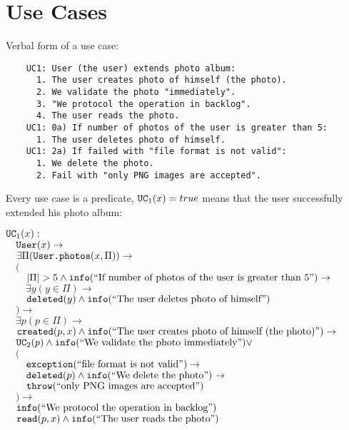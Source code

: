 \documentclass{article}
\begin{document}
\newpage
\section{Use Cases}

    Verbal form of a use case:
    
    \begin{verbatim}
    UC1: User (the user) extends photo album:
      1. The user creates photo of himself (the photo).
      2. We validate the photo "immediately".
      3. "We protocol the operation in backlog".
      4. The user reads the photo.
    UC1: 0a) If number of photos of the user is greater than 5:
      1. The user deletes photo of himself.
    UC1: 2a) If failed with "file format is not valid":
      1. We delete the photo.
      2. Fail with "only PNG images are accepted".\end{verbatim}

    Every use case is a predicate, $\mbox{\texttt{UC}}_1(x) = true$ means that the user
    successfully extended his photo album:
    
    \begin{maths}
    $\mbox{\texttt{UC}}_1(x) : $ \\
    $\quad \mbox{\texttt{User}}(x) \to$ \\
    $\quad \exists \Pi(\mbox{\texttt{User.photos}}(x, \Pi)) \to$ \\
    $\quad ($ \\
    $\quad\quad |\Pi| > 5 \wedge \mbox{\texttt{info}}(\mbox{``If number of photos of the user is greater than 5''})\to$ \\
    $\quad\quad \exists y(y \in \Pi) \to$ \\
    $\quad\quad \mbox{\texttt{deleted}}(y) \wedge \mbox{\texttt{info}}(\mbox{``The user deletes photo of himself''})$ \\
    $\quad ) \to$ \\
    $\quad \exists p(p \in \Pi) \to$ \\
    $\quad \mbox{\texttt{created}}(p, x) \wedge \mbox{\texttt{info}}(\mbox{``The user creates photo of himself (the photo)''})\to$ \\
    $\quad \mbox{\texttt{UC}}_2(p) \wedge \mbox{\texttt{info}}(\mbox{``We validate the photo immediately''}) \vee$ \\
    $\quad ($ \\
    $\quad\quad \mbox{\texttt{exception}}(\mbox{``file format is not valid''}) \to$ \\
    $\quad\quad \mbox{\texttt{deleted}}(p) \wedge \mbox{\texttt{info}}(\mbox{``We delete the photo''})\to$ \\
    $\quad\quad \mbox{\texttt{throw}}(\mbox{``only PNG images are accepted''})$ \\
    $\quad ) \to$ \\
    $\quad \mbox{\texttt{info}}(\mbox{``We protocol the operation in backlog''})$ \\
    $\quad \mbox{\texttt{read}}(p, x)\wedge \mbox{\texttt{info}}(\mbox{``The user reads the photo''})$ \\
    \end{maths}
    
\end{document}
